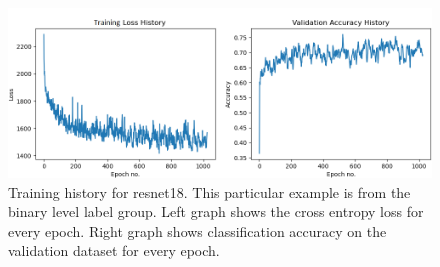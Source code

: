 \begin{figure}[h]
    \centering
    \includegraphics[width=\textwidth]{figures/res_ResNet18_blevel.png}
    \caption{Training history for \acrlong{resnet18}. This particular example is from the binary level label group. Left graph shows the cross entropy loss for every epoch. Right graph shows classification accuracy on the validation dataset for every epoch.}
    \label{fig:res_tr_resnet18}
\end{figure}
\FloatBarrier
